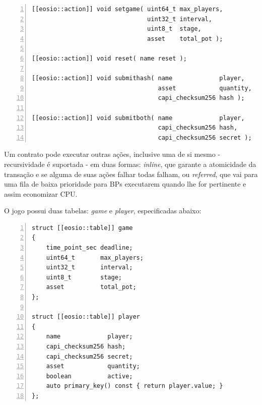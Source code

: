 \documentclass[a4paper,12pt]{monografia}
\theoremstyle{plain}
\theoremstyle{definition}
\theoremstyle{remark}
\begin{document}
\lstset{tabsize=5,language=C++,showstringspaces=false,basicstyle=\ttfamily\small,keywordstyle=\bf,breaklines=true}
\begin{singlespacing}
\begin{lstlisting}[frame=single,framexrightmargin=1pt,numbers=left]
[[eosio::action]] void setgame( uint64_t max_players,
                                uint32_t interval,
                                uint8_t  stage,
                                asset    total_pot );

[[eosio::action]] void reset( name reset );

[[eosio::action]] void submithash( name             player,
                                   asset            quantity,
                                   capi_checksum256 hash );

[[eosio::action]] void submitboth( name             player,
                                   capi_checksum256 hash,
                                   capi_checksum256 secret );
\end{lstlisting}
\end{singlespacing}

Um contrato pode executar outras a\c{c}\~oes, inclusive uma de si mesmo - recursividade \'e suportada - em duas formas: \textit{inline}, que garante a atomicidade da transa\c{c}\~ao e se alguma de suas a\c{c}\~oes falhar todas falham, ou \textit{referred}, que vai para uma fila de baixa prioridade para BPs executarem quando lhe for pertinente e assim economizar CPU.

O jogo possui duas tabelas: \textit{game} e \textit{player}, especificadas abaixo:

\lstset{tabsize=5,language=C++,showstringspaces=false,basicstyle=\ttfamily\small,keywordstyle=\bf,breaklines=true}
\begin{singlespacing}
\begin{lstlisting}[frame=single,framexrightmargin=1pt,numbers=left]
struct [[eosio::table]] game
{
    time_point_sec deadline;
    uint64_t       max_players;
    uint32_t       interval;
    uint8_t        stage;
    asset          total_pot;
};

struct [[eosio::table]] player
{
    name             player;
    capi_checksum256 hash;
    capi_checksum256 secret;
    asset            quantity;
    boolean          active;
    auto primary_key() const { return player.value; }
};
\end{lstlisting}
\end{singlespacing}
\end{document}
